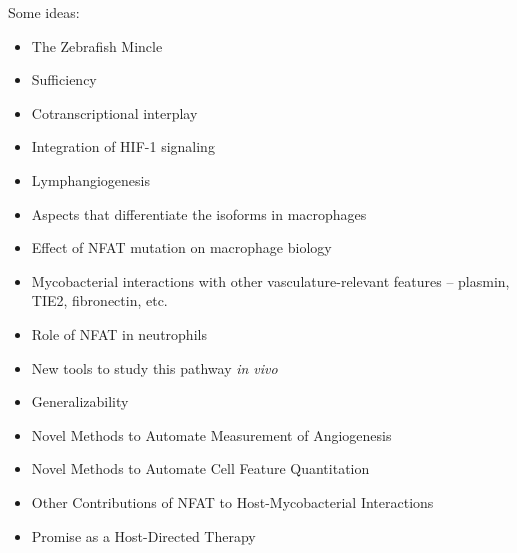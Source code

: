 


Some ideas:

\begin{itemize}

\item The Zebrafish Mincle
\item Sufficiency
\item Cotranscriptional interplay
\item Integration of HIF-1\textalpha{} signaling
\item Lymphangiogenesis
\item Aspects that differentiate the isoforms in macrophages
\item Effect of NFAT mutation on macrophage biology
\item Mycobacterial interactions with other vasculature-relevant features -- plasmin, TIE2, fibronectin, etc.
\item Role of NFAT in neutrophils
\item New tools to study this pathway \textit{in vivo}
\item Generalizability
\item Novel Methods to Automate Measurement of Angiogenesis
\item Novel Methods to Automate Cell Feature Quantitation
\item Other Contributions of NFAT to Host-Mycobacterial Interactions
\item Promise as a Host-Directed Therapy

\end{itemize}

